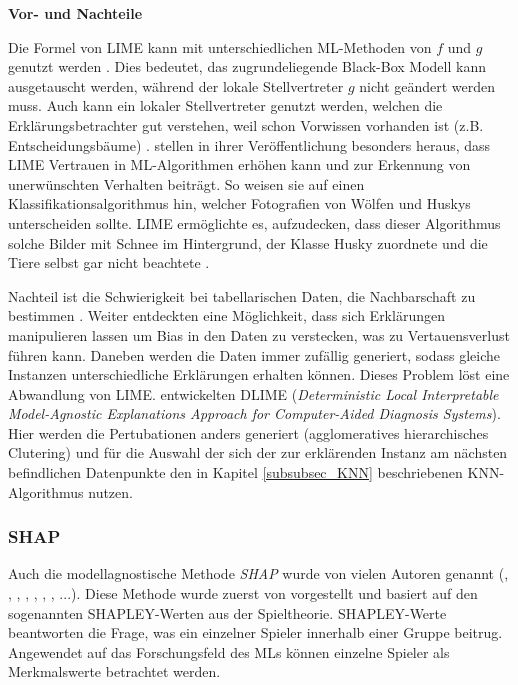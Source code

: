 \textbf{Vor- und Nachteile}

Die Formel von LIME kann mit unterschiedlichen ML-Methoden von $f$ und $g$ genutzt werden \cite{ribeiro2016should}. Dies bedeutet, das zugrundeliegende Black-Box Modell kann ausgetauscht werden, während der lokale Stellvertreter $g$ nicht geändert werden muss. Auch kann ein lokaler Stellvertreter genutzt werden, welchen die Erklärungsbetrachter gut verstehen, weil schon Vorwissen vorhanden ist (z.B. Entscheidungsbäume) \cite{molnar2022}. 
\textcite{ribeiro2016should} stellen in ihrer Veröffentlichung besonders heraus, dass LIME Vertrauen in ML-Algorithmen erhöhen kann und zur Erkennung von unerwünschten Verhalten beiträgt. So weisen sie auf einen Klassifikationsalgorithmus hin, welcher Fotografien von Wölfen und Huskys unterscheiden sollte. LIME ermöglichte es, aufzudecken, dass dieser Algorithmus solche Bilder mit Schnee im Hintergrund, der Klasse Husky zuordnete und die Tiere selbst gar nicht beachtete \cite{ribeiro2016should}.

Nachteil ist die Schwierigkeit bei tabellarischen Daten, die Nachbarschaft zu bestimmen \cite{molnar2022}. Weiter entdeckten \textcite{slack2020fooling} eine Möglichkeit, dass sich Erklärungen manipulieren lassen um Bias in den Daten zu verstecken, was zu Vertauensverlust führen kann.  Daneben werden die Daten immer zufällig generiert, sodass gleiche Instanzen unterschiedliche Erklärungen erhalten können. Dieses Problem löst eine Abwandlung von LIME. \textcite{zafar2019dlime} entwickelten DLIME (\emph{Deterministic Local Interpretable Model-Agnostic Explanations Approach for Computer-Aided Diagnosis Systems}). Hier werden die Pertubationen anders generiert (agglomeratives hierarchisches Clutering) und für die Auswahl der sich der zur erklärenden Instanz am nächsten befindlichen Datenpunkte den in Kapitel \ref{subsubsec_KNN} beschriebenen KNN-Algorithmus nutzen.

\subsubsection{SHAP}
Auch die modellagnostische Methode \emph{SHAP} wurde von vielen Autoren genannt (\cite{tsiakmaki2021case}, \cite{vaughan2020human}, \cite{schoeffer2022human}, \cite{hanif2021survey}, \cite{gomez2021advice}, \cite{wang2020explainable}, \cite{palaniyappan2022aqx}, ...). Diese Methode wurde zuerst von \textcite{lundberg2017unified} vorgestellt und basiert auf den sogenannten SHAPLEY-Werten aus der Spieltheorie. SHAPLEY-Werte beantworten die Frage, was ein einzelner Spieler innerhalb einer Gruppe beitrug. Angewendet auf das Forschungsfeld des MLs können einzelne Spieler als Merkmalswerte betrachtet werden\cite{wang2020explainable}.

